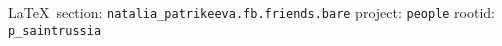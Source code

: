  
 
  
\vspace{0.5cm}
 {\ifDEBUG\small\LaTeX~section: \verb|natalia_patrikeeva.fb.friends.bare| project: \verb|people| rootid: \verb|p_saintrussia| \fi}
\vspace{0.5cm}
  
